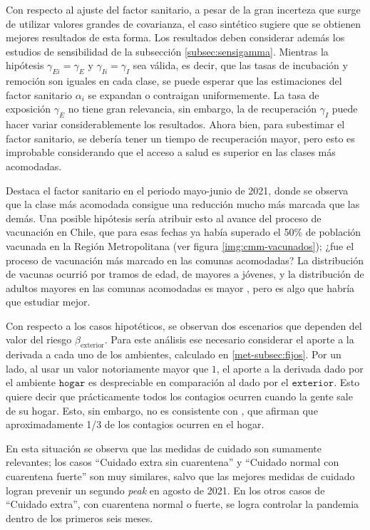 Con respecto al ajuste del factor sanitario, a pesar de la gran incerteza que surge de utilizar valores grandes de covarianza, el caso sintético sugiere que se obtienen mejores resultados de esta forma. Los resultados deben considerar además los estudios de sensibilidad de la subsección \ref{subsec:sensigamma}. Mientras la hipótesis \(\gamma_{Ei} = \gamma_E\) y \(\gamma_{Ii} = \gamma_I\) sea válida, es decir, que las tasas de incubación y remoción son iguales en cada clase, se puede esperar que las estimaciones del factor sanitario \(\alpha_i\) se expandan o contraigan uniformemente. La tasa de exposición \(\gamma_E\) no tiene gran relevancia, sin embargo, la de recuperación \(\gamma_I\) puede hacer variar considerablemente los resultados. Ahora bien, para subestimar el factor sanitario, se debería tener un tiempo de recuperación mayor, pero esto es improbable considerando que el acceso a salud es superior en las clases más acomodadas.

Destaca el factor sanitario en el periodo mayo-junio de 2021, donde se observa que la clase más acomodada consigue una reducción mucho más marcada que las demás. Una posible hipótesis sería atribuir esto al avance del proceso de vacunación en Chile, que para esas fechas ya había superado el 50\% de población vacunada en la Región Metropolitana (ver figura \ref{img:cmm-vacunados}); ¿fue el proceso de vacunación más marcado en las comunas acomodadas? La distribución de vacunas ocurrió por tramos de edad, de mayores a jóvenes, y la distribución de adultos mayores en las comunas acomodadas es mayor \cite{LaTercera}, pero es algo que habría que estudiar mejor.

Con respecto a los casos hipotéticos, se observan dos escenarios que dependen del valor del riesgo \(\beta_{\text{exterior}}\). Para este análisis ese necesario considerar el aporte a la derivada a cada uno de los ambientes, calculado en \ref{met-subsec:fijos}. Por un lado, al usar un valor notoriamente mayor que \(1\), el aporte a la derivada dado por el ambiente \(\texttt{hogar}\) es despreciable en comparación al dado por el \(\texttt{exterior}\). Esto quiere decir que prácticamente todos los contagios ocurren cuando la gente sale de su hogar. Esto, sin embargo, no es consistente con \cite{Ferguson2020}\cite{Mossong2008}, que afirman que aproximadamente 1/3 de los contagios ocurren en el hogar.

En esta situación se observa que las medidas de cuidado son sumamente relevantes; los casos ``Cuidado extra sin cuarentena'' y ``Cuidado normal con cuarentena fuerte'' son muy similares, salvo que las mejores medidas de cuidado logran prevenir un segundo \textit{peak} en agosto de 2021. En los otros casos de ``Cuidado extra'', con cuarentena normal o fuerte, se logra controlar la pandemia dentro de los primeros seis meses.

